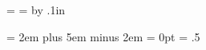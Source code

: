 


\def\newpage{\vfill\eject}

\def\biggg#1{{\hbox{$\left#1\vbox to20.5pt{}\right.$}}}
\def\bigggl{\mathopen\biggg}
\def\bigggr{\mathclose\biggg}
\def\Biggg#1{{\hbox{$\left#1\vbox to23.5pt{}\right.$}}}
\def\Bigggl{\mathopen\Biggg}
\def\Bigggr{\mathclose\Biggg}




% 
\rm
\headline = {\hfil {\tenrm\folio} \hfil}
\footline = {}
\advance\vsize by .1in
\raggedbottom
\raggedright
\rightskip = 2em plus 5em minus 2em
\parindent = 0pt
\parskip = .5\baselineskip



